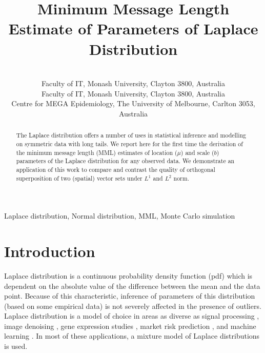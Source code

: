 \documentclass[wcp]{jmlr}
\title[MML Laplace]{Minimum Message Length Estimate of Parameters of Laplace Distribution}
\author{\Name{Parthan Kasarapu} \Email{parthan.kasarapu@monash.edu}\\
  \addr Faculty of IT, Monash University, Clayton 3800, Australia
  \AND
  \Name{Lloyd Allison} \Email{lloyd.allison@monash.edu}\\
  \addr Faculty of IT, Monash University, Clayton 3800, Australia
  \AND
  \Name{Enes Makalic} \Email{emakalic@unimelb.edu.au}\\
  \addr Centre for MEGA Epidemiology, The University of Melbourne, Carlton 3053, Australia
 }
\begin{document}
\maketitle

\begin{abstract}
The Laplace distribution offers a number of uses in statistical inference and
modelling on symmetric data with long tails. We report here for the first time
the derivation of the minimum message length (MML) estimates of location ($\mu$) and 
scale ($b$) parameters of the Laplace distribution for any observed data. 
We demonstrate an application of this work to compare and contrast the
quality of orthogonal superposition of two (spatial) vector sets under 
$L^1$ and $L^2$ norm.
\end{abstract}


\begin{keywords}
Laplace distribution, Normal distribution, MML, Monte Carlo simulation
\end{keywords}

\section{Introduction}
Laplace distribution is a continuous probability density function (pdf) which is dependent on
the absolute value of the difference between the mean and the data point. Because of
this characteristic, inference of parameters of this distribution (based on some 
empirical data) is not severely affected in the presence of outliers. Laplace distribution
is a model of choice in areas as diverse as signal processing 
\citep{laplace-signal-processing}, image denoising \citep{image-denoising},
gene expression studies \citep{Bhowmick01102006}, market risk prediction
\citep{haas2005modeling}, and machine learning \citep{Cord:2006:FSR:1167556.1167570}.
In most of these applications, a mixture model of Laplace distributions is used. \\
\end{document}
